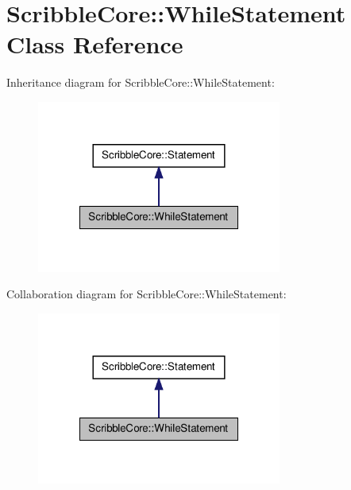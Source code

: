 \hypertarget{class_scribble_core_1_1_while_statement}{\section{Scribble\-Core\-:\-:While\-Statement Class Reference}
\label{class_scribble_core_1_1_while_statement}
}


Inheritance diagram for Scribble\-Core\-:\-:While\-Statement\-:
\nopagebreak
\begin{figure}[H]
\begin{center}
\leavevmode
\includegraphics[width=228pt]{class_scribble_core_1_1_while_statement__inherit__graph}
\end{center}
\end{figure}


Collaboration diagram for Scribble\-Core\-:\-:While\-Statement\-:
\nopagebreak
\begin{figure}[H]
\begin{center}
\leavevmode
\includegraphics[width=228pt]{class_scribble_core_1_1_while_statement__coll__graph}
\end{center}
\end{figure}
